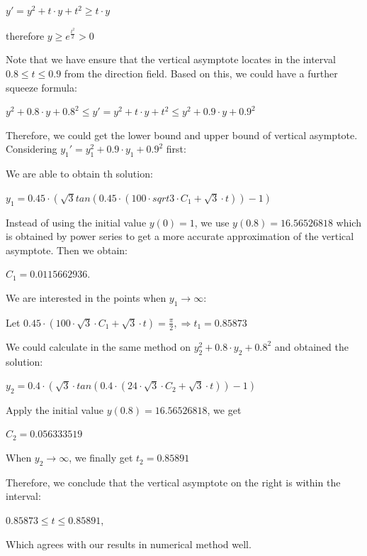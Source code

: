 \documentclass[11pt,a4paper]{article}
\begin{document}
	\begin{center}
		$y'=y^2+t \cdot y+t^2 \geq t \cdot y$

		therefore $y \geq e^{\frac{t^2}{2}}>0$
	\end{center}

	Note that we have ensure that the vertical asymptote locates in the interval $0.8\leq t \leq 0.9$ from the direction field. Based on this, we could have a further squeeze formula: 
	\begin{center}
		$y^2+0.8 \cdot y+0.8^2 \leq y' = y^2+t \cdot y+t^2 \leq y^2+0.9 \cdot y+0.9^2$
	\end{center}
	Therefore, we could get the lower bound and upper bound of vertical asymptote. Considering $y_1'=y_1^2+0.9 \cdot y_1+0.9^2$ first:

	We are able to obtain th solution:
	\begin{center}
		$y_1=0.45 \cdot (\sqrt3tan(0.45 \cdot (100 \cdot sqrt3 \cdot C_1+\sqrt{3} \cdot t))-1)$
	\end{center}
	Instead of using the initial value $y(0)=1$, we use $y(0.8)=16.56526818$ which is obtained by power series to get a more accurate approximation of the vertical asymptote. Then we obtain: 
	\begin{center}
		$C_1=0.0115662936$.
	\end{center}
	We are interested in the points when $y_1 \rightarrow \infty$:
	\begin{center}
		Let $0.45 \cdot (100 \cdot \sqrt3 \cdot C_1+\sqrt3 \cdot t)=\frac{\pi}{2}, \Rightarrow t_1 = 0.85873$
	\end{center}

	We could calculate in the same method on $y_2^2+0.8 \cdot y_2+0.8^2$ and obtained the solution:

	\begin{center}
		$y_2=0.4 \cdot (\sqrt{3} \cdot tan(0.4 \cdot (24 \cdot \sqrt{3} \cdot C_2+\sqrt{3} \cdot t))-1)$
	\end{center}

	Apply the initial value $y(0.8) = 16.56526818$, we get 

	\begin{center}
		$C_2=0.056333519$
	\end{center}

	When $y_2 \rightarrow \infty$, we finally get $t_2=0.85891$

	Therefore, we conclude that the vertical asymptote on the right is within the interval:
	\begin{center}
		$0.85873 \leq t \leq 0.85891$,
	\end{center}
	 Which agrees with our results in numerical method well.
	
\end{document}
